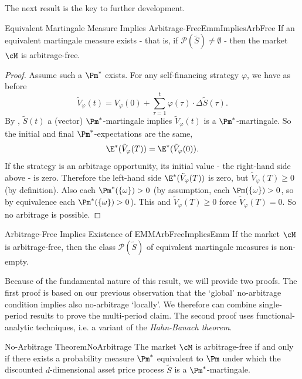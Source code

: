 The next result is the key to further development.

\begin{prop}{Equivalent Martingale Measure Implies Arbitrage-Free}{EmmImpliesArbFree}
	If an equivalent martingale measure exists - that is, if \(\mathcal{P}(\tilde{S}) \neq \emptyset\) - then the market \(\cM\) is arbitrage-free.
\end{prop}

\begin{proof}
	Assume such a \(\Pm^*\) exists. For any self-financing strategy \(\varphi\), we have as before
	\[
		\tilde{V}_{\varphi}(t) = V_{\varphi}(0) + \sum_{\tau=1}^t \varphi(\tau) \cdot \Delta\tilde{S}(\tau).
	\]
	By , \(\tilde{S}(t)\) a (vector) \(\Pm^*\)-martingale implies \(\tilde{V}_{\varphi}(t)\) is a \(\Pm^*\)-martingale. So the initial and final \(\Pm^*\)-expectations are the same,
	\[
		\E^*(\tilde{V}_{\varphi}(T)) = \E^*(\tilde{V}_{\varphi}(0)).
	\]
	If the strategy is an arbitrage opportunity, its initial value - the right-hand side above - is zero. Therefore the left-hand side \(\E^*(\tilde{V}_{\varphi}(T))\) is zero, but \(\tilde{V}_{\varphi}(T) \geq 0\) (by definition). Also each \(\Pm^*(\{ \omega \}) > 0\) (by assumption, each \(\Pm(\{ \omega \}) > 0\), so by equivalence each \(\Pm^*(\{ \omega \}) > 0\)). This and \(\tilde{V}_{\varphi}(T) \geq 0\) force \(\tilde{V}_{\varphi}(T) = 0\). So no arbitrage is possible.
\end{proof}

\begin{prop}{Arbitrage-Free Implies Existence of EMM}{ArbFreeImpliesEmm}
	If the market \(\cM\) is arbitrage-free, then the class \(\mathcal{P}(\tilde{S})\) of equivalent martingale measures is non-empty.
\end{prop}

Because of the fundamental nature of this result, we will provide two proofs. The first proof is based on our previous observation that the `global' no-arbitrage condition implies also no-arbitrage `locally'. We therefore can combine single-period results to prove the multi-period claim. The second proof uses functional-analytic techniques, i.e. a variant of the \textit{Hahn-Banach theorem}.

\begin{thm}{No-Arbitrage Theorem}{NoArbitrage}
	The market \(\cM\) is arbitrage-free if and only if there exists a probability measure \(\Pm^*\) equivalent to \(\Pm\) under which the discounted \(d\)-dimensional asset price process \(\tilde{S}\) is a \(\Pm^*\)-martingale.
\end{thm}

